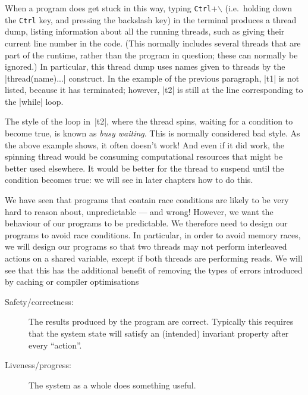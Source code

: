 When a program does get stuck in this way, typing \texttt{Ctrl}+$\backslash$
(i.e.~holding down the \texttt{Ctrl} key, and pressing the backslash key) in
the terminal produces a thread dump, listing information about all the running
threads, such as giving their current line number in the code.  (This normally
includes several threads that are part of the runtime, rather than the program
in question; these can normally be ignored.)  In particular, this thread dump
uses names given to threads by the |thread(name){...}| construct.  In the
example of the previous paragraph, |t1| is not listed, because it has
terminated; however, |t2| is still at the line corresponding to the |while|
loop.

The style of the loop in~|t2|, where the thread spins, waiting for a condition
to become true, is known as \emph{busy waiting}.  This is normally considered
bad style.  As the above example shows, it often doesn't work!  And even if it
did work, the spinning thread would be consuming computational resources that
might be better used elsewhere.  It would be better for the thread to suspend
until the condition becomes true: we will see in later chapters how to do
this.  

We have seen that programs that contain race conditions are likely to be very
hard to reason about, unpredictable --- and wrong!  However, we want the
behaviour of our programs to be predictable.  We therefore need to design our
programs to avoid race conditions.  In particular, in order to avoid memory
races, we will design our programs so that two threads may not perform
interleaved actions on a shared variable, except if both threads are
performing reads.  We will see that this has the additional benefit of
removing the types of errors introduced by caching or compiler optimisations




\begin{description}
\item[Safety/correctness:] The results produced by the program are correct.
  Typically this requires that the system state will satisfy an (intended)
  invariant property after every ``action''.

\item[Liveness/progress:] The system as a whole does something useful.
\end{description}

